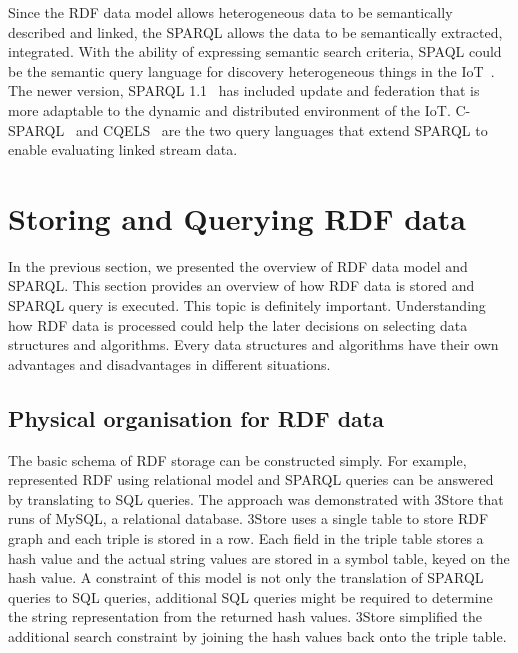 {Since the RDF data model allows heterogeneous data to be semantically described and linked, the SPARQL allows the data to be semantically extracted, integrated.
With the ability of expressing semantic search criteria, SPAQL could be the semantic query language for discovery heterogeneous things in the IoT~\citep{Jsan:2013,Chun:2015}.
The newer version, SPARQL 1.1~\citep{Harris:2013} has included update and federation that is more adaptable to the dynamic and distributed environment of the IoT. 
C-SPARQL~\citep{Barbieri:2009} and CQELS~\citep{Le-Phuoc:2011} are the two query languages that extend SPARQL to enable evaluating linked stream data.


\section{Storing and Querying RDF data}
\label{s:sq}

In the previous section, we presented the overview of RDF data model and SPARQL.
This section provides an overview of how RDF data is stored and SPARQL query is executed. 
This topic is definitely important.
Understanding how RDF data is processed could help the later decisions on selecting data structures and algorithms.
Every data structures and algorithms have their own advantages and disadvantages in different situations.

\subsection{Physical organisation for RDF data}

The basic schema of RDF storage can be constructed simply.
For example, \cite{Harris:2005} represented RDF using relational model and SPARQL queries can be answered by translating to SQL queries.
The approach was demonstrated with 3Store that runs of MySQL, a relational database.
3Store uses a single table to store RDF graph and each triple is stored in a row. 
Each field in the triple table stores a hash value and the actual string values are stored in a symbol table, keyed on the hash value.
A constraint of this model is not only the translation of SPARQL queries to SQL queries, additional SQL queries might be required to determine the string representation from the returned hash values. 
3Store simplified the additional search constraint by joining the hash values back onto the triple table.

}
